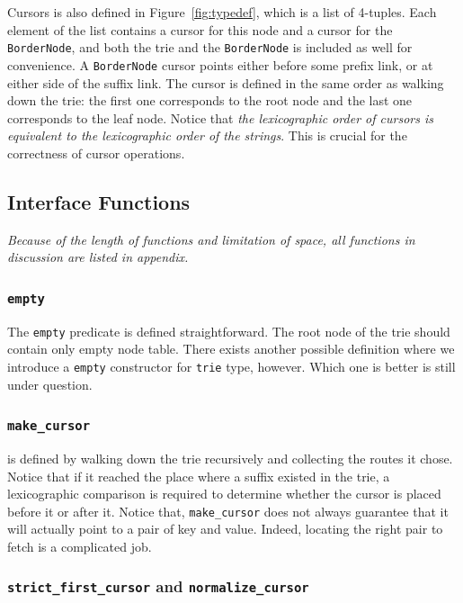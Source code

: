 \documentclass[runningheads]{llncs}
\begin{document}
Cursors is also defined in Figure~\ref{fig:typedef}, which is a list of
4-tuples. Each element of the list contains a cursor for this node and a cursor
for the \texttt{BorderNode}, and both the trie and the \texttt{BorderNode} is
included as well for convenience. A \texttt{BorderNode} cursor points either
before some prefix link, or at either side of the suffix link. The cursor is
defined in the same order as walking down the trie: the first one corresponds to
the root node and the last one corresponds to the leaf node. Notice that
\emph{the lexicographic order of cursors is equivalent to the lexicographic
  order of the strings}. This is crucial for the correctness of cursor
operations.

\subsection{Interface Functions}

\emph{Because of the length of functions and limitation of space, all functions
  in discussion are listed in appendix.}

\subsubsection{\texttt{empty}}

The \texttt{empty} predicate is defined straightforward. The root node of the trie
should contain only empty node table. There exists another possible definition
where we introduce a \texttt{empty} constructor for \texttt{trie} type, however.
Which one is better is still under question.

\subsubsection{\texttt{make\_cursor}}

is defined by walking down the trie recursively and collecting the routes it
chose. Notice that if it reached the place where a suffix existed in the trie, a
lexicographic comparison is required to determine whether the cursor is placed
before it or after it. Notice that, \texttt{make\_cursor} does not always
guarantee that it will actually point to a pair of key and value. Indeed,
locating the right pair to fetch is a complicated job.


\subsubsection{\texttt{strict\_first\_cursor} and \texttt{normalize\_cursor}}
\end{document}
